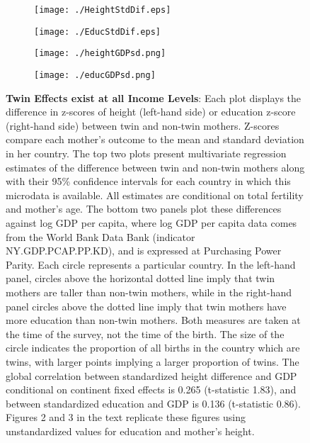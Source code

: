 \documentclass{nature}
\begin{document}
\begin{linenumbers}
\begin{spacing}{1}
\begin{figure}[htpb!]
\begin{subfigure}{.5\textwidth}
  \texttt{[image: ./HeightStdDif.eps]}
\end{subfigure}%
\begin{subfigure}{.5\textwidth}
  \texttt{[image: ./EducStdDif.eps]}
\end{subfigure}
\begin{subfigure}{.5\textwidth}
  \texttt{[image: ./heightGDPsd.png]}
\end{subfigure}%
\begin{subfigure}{.5\textwidth}
  \texttt{[image: ./educGDPsd.png]}
\end{subfigure}
\vspace{5mm}
\caption{\textbf{Twin Effects exist at all Income Levels}: {\footnotesize Each plot displays the difference in z-scores of height (left-hand side) or education z-score (right-hand side) between twin and non-twin mothers. Z-scores compare each mother's outcome to the mean and standard deviation in her country.  The top two plots present multivariate regression estimates of the difference between twin and non-twin mothers along with their 95\% confidence intervals for each country in which this microdata is available.  All estimates are conditional on total fertility and mother's age.  The bottom two panels plot these differences against log GDP per capita, where log GDP per capita data comes from the World Bank Data Bank (indicator NY.GDP.PCAP.PP.KD), and is expressed at Purchasing Power Parity.  Each circle represents a particular country.  In the left-hand panel, circles above the horizontal dotted line imply that twin mothers are taller than non-twin mothers, while in the right-hand panel circles above the dotted line imply that twin mothers have more education than non-twin mothers.  Both measures are taken at the time of the survey, not the time of the birth.  The size of the circle indicates the proportion of all births in the country which are twins, with larger points implying a larger proportion of twins. The global correlation between standardized height difference and GDP conditional on continent fixed effects is 0.265 (t-statistic 1.83), and between standardized education and GDP is 0.136 (t-statistic 0.86). Figures 2 and 3 in the text replicate these figures using unstandardized values for education and mother's height.}}
\end{figure}


\end{spacing}
\end{linenumbers}
\end{document}
